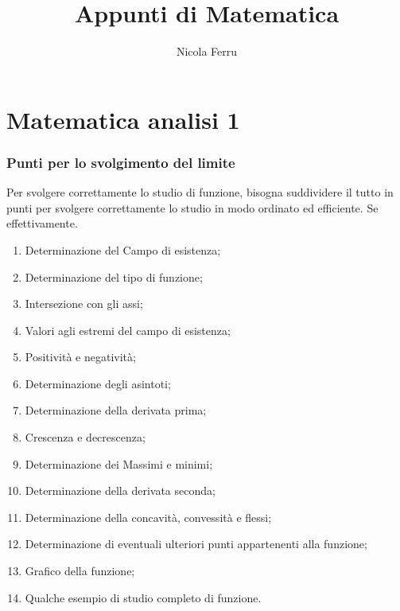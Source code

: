\documentclass{book}
\title{Appunti di Matematica}
\author{Nicola Ferru}
\date{}
\begin{document}
\maketitle
\tableofcontents
\listoftables
\listoffigures


\part{Matematica analisi 1}




\section{Punti per lo svolgimento del limite}
Per svolgere correttamente lo studio di funzione, bisogna suddividere il tutto
in punti per svolgere correttamente lo studio in modo ordinato ed efficiente.
Se effettivamente. 
\begin{enumerate}
	\item Determinazione del Campo di esistenza;
	\item Determinazione del tipo di funzione;
	\item Intersezione con gli assi;
	\item Valori agli estremi del campo di esistenza;
	\item Positività e negatività;
	\item Determinazione degli asintoti;
	\item Determinazione della derivata prima;
	\item Crescenza e decrescenza;
	\item Determinazione dei Massimi e minimi;
	\item Determinazione della derivata seconda;
	\item Determinazione della concavità, convessità e flessi;
	\item Determinazione di eventuali ulteriori punti appartenenti alla
		funzione;
	\item Grafico della funzione;
	\item Qualche esempio di studio completo di funzione.
\end{enumerate}
\end{document}
